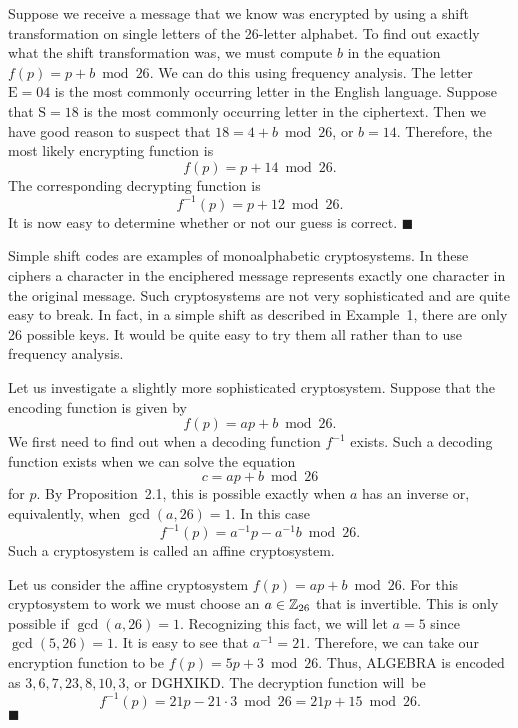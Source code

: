  
Suppose we receive a message that we know was encrypted by using a
shift transformation on single letters of the 26-letter alphabet. To
find out exactly what the shift transformation was, we must compute
$b$ in the equation $f(p) = p + b \bmod 26$. We can do this using
frequency analysis.  The letter $\mbox{E} = 04$ is the most commonly
occurring letter in the English language. Suppose that $\mbox{S} = 18$
is the most commonly occurring letter in the ciphertext.  Then we have
good reason to suspect that  $18 = 4 + b \bmod 26$, or $b= 14$.
Therefore, the most likely encrypting function is
$$
f(p) = p + 14 \bmod 26.
$$
The corresponding decrypting function is
$$
f^{-1}(p) = p + 12 \bmod 26.
$$
It is now easy to determine whether or not our guess is correct.
\hspace{\fill} $\blacksquare$
 
 
\medskip
 
 
Simple shift codes are examples of {\bfi monoalphabetic
cryptosystems}. In these ciphers a
character in the enciphered message represents exactly one character
in the original message. Such cryptosystems are not very sophisticated
and are quite easy to break. In fact, in a simple shift as described
in Example~1, there are only 26 possible keys. It would be quite easy
to try them all rather than to use frequency analysis. 
 
 
Let us investigate a slightly more sophisticated cryptosystem. Suppose
that the encoding function is given by  
$$
f(p) = ap + b \bmod 26.
$$
We first need to find out when a decoding function $f^{-1}$ exists.
Such a decoding function exists when we can solve the equation
$$
c = ap + b \bmod 26
$$
for $p$. By Proposition~2.1, this is possible exactly when $a$ has an
inverse or, equivalently, when $\gcd( a, 26) =1$. In this case 
$$
f^{-1}(p) = a^{-1} p - a^{-1} b \bmod 26.
$$
Such a cryptosystem is called an {\bfi affine
cryptosystem}. 
 
 
\medskip
 
 
Let us consider the affine cryptosystem $f(p) = ap + b \bmod 26$. For
this cryptosystem to work we must choose an $a \in {\Bbb Z}_{26}$
that is invertible. This is only possible if $\gcd(a, 26) = 1$.
Recognizing this fact, we will let $a = 5$ since $\gcd(5, 26) = 1$. It
is easy to see that $a^{-1} = 21$. Therefore, we can take our
encryption function to be $f(p) = 5p + 3 \bmod 26$. Thus, ALGEBRA is
encoded as $3, 6, 7, 23, 8, 10, 3$, or DGHXIKD. The decryption
function will~be   
$$
f^{-1}(p) = 21 p - 21 \cdot 3 \bmod 26 = 21 p + 15 \bmod 26.
$$
\hspace{\fill} $\blacksquare$
 

